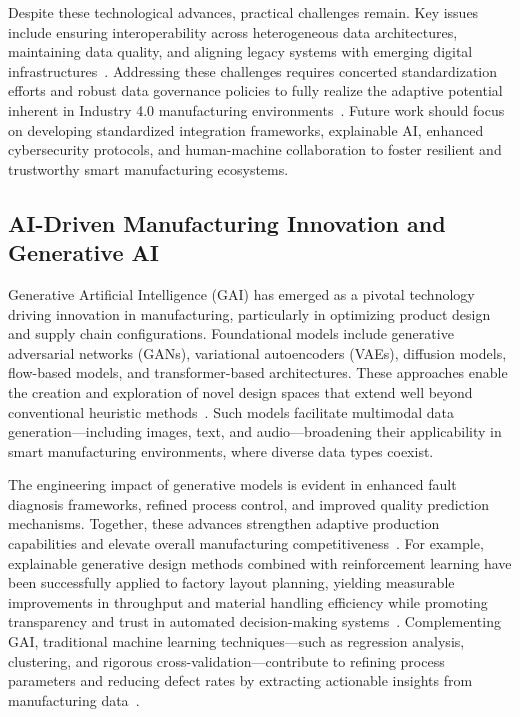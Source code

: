 \documentclass[sigconf]{acmart}
\begin{document}
Despite these technological advances, practical challenges remain. Key issues include ensuring interoperability across heterogeneous data architectures, maintaining data quality, and aligning legacy systems with emerging digital infrastructures~\cite{ref42}. Addressing these challenges requires concerted standardization efforts and robust data governance policies to fully realize the adaptive potential inherent in Industry 4.0 manufacturing environments~\cite{ref38,ref42}. Future work should focus on developing standardized integration frameworks, explainable AI, enhanced cybersecurity protocols, and human-machine collaboration to foster resilient and trustworthy smart manufacturing ecosystems.

\subsection{AI-Driven Manufacturing Innovation and Generative AI}

Generative Artificial Intelligence (GAI) has emerged as a pivotal technology driving innovation in manufacturing, particularly in optimizing product design and supply chain configurations. Foundational models include generative adversarial networks (GANs), variational autoencoders (VAEs), diffusion models, flow-based models, and transformer-based architectures. These approaches enable the creation and exploration of novel design spaces that extend well beyond conventional heuristic methods~\cite{ref1,ref8}. Such models facilitate multimodal data generation—including images, text, and audio—broadening their applicability in smart manufacturing environments, where diverse data types coexist.

The engineering impact of generative models is evident in enhanced fault diagnosis frameworks, refined process control, and improved quality prediction mechanisms. Together, these advances strengthen adaptive production capabilities and elevate overall manufacturing competitiveness~\cite{ref7,ref9,ref36}. For example, explainable generative design methods combined with reinforcement learning have been successfully applied to factory layout planning, yielding measurable improvements in throughput and material handling efficiency while promoting transparency and trust in automated decision-making systems~\cite{ref9}. Complementing GAI, traditional machine learning techniques—such as regression analysis, clustering, and rigorous cross-validation—contribute to refining process parameters and reducing defect rates by extracting actionable insights from manufacturing data~\cite{ref10,ref13}.
\end{document}
